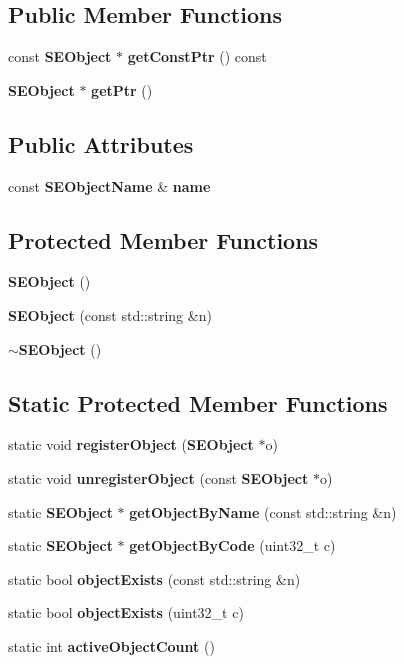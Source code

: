 \subsection*{Public Member Functions}
\begin{DoxyCompactItemize}
\item 
const {\bf S\+E\+Object} $\ast$ {\bf get\+Const\+Ptr} () const 
\item 
{\bf S\+E\+Object} $\ast$ {\bf get\+Ptr} ()
\end{DoxyCompactItemize}
\subsection*{Public Attributes}
\begin{DoxyCompactItemize}
\item 
const {\bf S\+E\+Object\+Name} \& {\bf name}
\end{DoxyCompactItemize}
\subsection*{Protected Member Functions}
\begin{DoxyCompactItemize}
\item 
{\bf S\+E\+Object} ()
\item 
{\bf S\+E\+Object} (const std\+::string \&n)
\item 
{\bf $\sim$\+S\+E\+Object} ()
\end{DoxyCompactItemize}
\subsection*{Static Protected Member Functions}
\begin{DoxyCompactItemize}
\item 
static void {\bf register\+Object} ({\bf S\+E\+Object} $\ast$o)
\item 
static void {\bf unregister\+Object} (const {\bf S\+E\+Object} $\ast$o)
\item 
static {\bf S\+E\+Object} $\ast$ {\bf get\+Object\+By\+Name} (const std\+::string \&n)
\item 
static {\bf S\+E\+Object} $\ast$ {\bf get\+Object\+By\+Code} (uint32\+\_\+t c)
\item 
static bool {\bf object\+Exists} (const std\+::string \&n)
\item 
static bool {\bf object\+Exists} (uint32\+\_\+t c)
\item 
static int {\bf active\+Object\+Count} ()
\end{DoxyCompactItemize}


